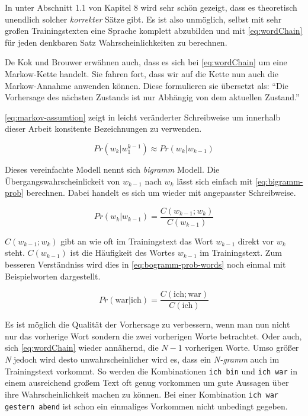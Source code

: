     In \parencite{nltk:book} unter Abschnitt 1.1 von Kapitel 8 wird sehr schön gezeigt, dass es theoretisch unendlich solcher \emph{korrekter} Sätze gibt. Es ist also unmöglich, selbst mit sehr großen Trainingstexten eine Sprache komplett abzubilden und mit \autoref{eq:wordChain} für jeden denkbaren Satz Wahrscheinlichkeiten zu berechnen. 
        
    De Kok und Brouwer erwähnen auch, dass es sich bei \autoref{eq:wordChain} um eine Markow-Kette handelt. Sie fahren fort, dass wir auf die Kette nun auch die Markow-Annahme anwenden können. Diese formulieren sie übersetzt als: \enquote{Die Vorhersage des nächsten Zustands ist nur Abhängig von dem aktuellen Zustand.}\parencite[Abs.  3.8]{nlwp:book}
        
    \autoref{eq:markov-assumtion} zeigt \parencite[Abs.  3.8, Gleichung 3.8]{nlwp:book} in leicht veränderter Schreibweise um innerhalb dieser Arbeit konsitente Bezeichnungen zu verwenden.  
        
    \begin{equation}
       	Pr(w_k|w_1^{k-1}) \approx Pr(w_k|w_{k-1})
       	\label{eq:markov-assumtion}
    \end{equation}
        
    Dieses vereinfachte Modell nennt sich \emph{bigramm} Modell. Die Übergangswahrscheinlickeit von \(w_{k-1}\) nach \(w_k\) lässt sich einfach mit \autoref{eq:bigramm-prob} berechnen. Dabei handelt es sich um \parencite[Abs.  3.8, Gleichung 3.9]{nlwp:book} wieder mit angepasster Schreibweise.
        
    \begin{equation}
       	Pr(w_k|w_{k-1}) = \frac{C(w_{k-1};w_k)}{C(w_{k-1})}
       	\label{eq:bigramm-prob}
    \end{equation}
    	
    \(C(w_{k-1};w_k)\) gibt an wie oft im Trainingstext das Wort \(w_{k-1}\) direkt vor \(w_k\) steht. \(C(w_{k-1})\) ist die Häufigkeit des Wortes \(w_{k-1}\) im Trainingstext. Zum besseren Verständniss wird dies in \autoref{eq:bogramm-prob-words} noch einmal mit Beispielworten dargestellt.
        
    \begin{equation}
       	Pr(\text{war}|\text{ich}) = \frac{C(\text{ich};\text{war})}{C(\text{ich})}
       	\label{eq:bogramm-prob-words}
    \end{equation}
        
        
    Es ist möglich die Qualität der Vorhersage zu verbessern, wenn man nun nicht nur das vorherige Wort sondern die zwei vorherigen Worte betrachtet. Oder auch, sich \autoref{eq:wordChain} wieder annähernd, die \(N - 1\) vorherigen Worte. Umso größer \emph{N} jedoch wird desto unwahrscheinlicher wird es, dass ein \emph{N-gramm} auch im Trainingstext vorkommt. So werden die Kombinationen \texttt{ich bin} und \texttt{ich war} in einem ausreichend großem Text oft genug vorkommen um gute Aussagen über ihre Wahrscheinlichkeit machen zu können. Bei einer Kombination \texttt{ich war gestern abend} ist schon ein einmaliges Vorkommen nicht unbedingt gegeben.
        
